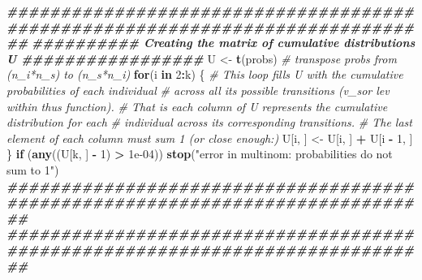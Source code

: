 \documentclass[
]{article}
\newenvironment{Shaded}{\begin{snugshade}}{\end{snugshade}}
\newcommand{\CommentTok}[1]{\textcolor[rgb]{0.56,0.35,0.01}{\textit{#1}}}
\newcommand{\ControlFlowTok}[1]{\textcolor[rgb]{0.13,0.29,0.53}{\textbf{#1}}}
\newcommand{\DecValTok}[1]{\textcolor[rgb]{0.00,0.00,0.81}{#1}}
\newcommand{\DocumentationTok}[1]{\textcolor[rgb]{0.56,0.35,0.01}{\textbf{\textit{#1}}}}
\newcommand{\FloatTok}[1]{\textcolor[rgb]{0.00,0.00,0.81}{#1}}
\newcommand{\FunctionTok}[1]{\textcolor[rgb]{0.13,0.29,0.53}{\textbf{#1}}}
\newcommand{\NormalTok}[1]{#1}
\newcommand{\OtherTok}[1]{\textcolor[rgb]{0.56,0.35,0.01}{#1}}
\newcommand{\SpecialCharTok}[1]{\textcolor[rgb]{0.81,0.36,0.00}{\textbf{#1}}}
\newcommand{\StringTok}[1]{\textcolor[rgb]{0.31,0.60,0.02}{#1}}
\begin{document}
\begin{Shaded}
\begin{Highlighting}[]
  
  \DocumentationTok{\#\#\#\#\#\#\#\#\#\#\#\#\#\#\#\#\#\#\#\#\#\#\#\#\#\#\#\#\#\#\#\#\#\#\#\#\#\#\#\#\#\#\#\#\#\#\#\#\#\#\#\#\#\#\#\#\#\#\#\#\#\#\#\#\#\#\#\#\#\#\#\#\#\#\#\#\#\#}
  \DocumentationTok{\#\#\#\#\#\#\#\#\#\# Creating the matrix of cumulative distributions U \#\#\#\#\#\#\#\#\#\#\#\#\#\#\#\#\#}
\NormalTok{  U }\OtherTok{\textless{}{-}} \FunctionTok{t}\NormalTok{(probs)    }\CommentTok{\# transpose probs from (\textasciigrave{}n\_i*n\_s\textasciigrave{}) to (\textasciigrave{}n\_s*n\_i\textasciigrave{})}
  \ControlFlowTok{for}\NormalTok{(i }\ControlFlowTok{in} \DecValTok{2}\SpecialCharTok{:}\NormalTok{k) \{  }
    \CommentTok{\# This loop fills U with the cumulative probabilities of each individual}
    \CommentTok{\# across all its possible transitions (\textasciigrave{}v\_s\textasciigrave{}or \textasciigrave{}lev\textasciigrave{} within thus function).}
    \CommentTok{\# That is each column of \textasciigrave{}U\textasciigrave{} represents the cumulative distribution for each}
    \CommentTok{\# individual across its corresponding transitions. }
    \CommentTok{\# The last element of each column must sum 1 (or close enough:)}
\NormalTok{    U[i, ] }\OtherTok{\textless{}{-}}\NormalTok{ U[i, ] }\SpecialCharTok{+}\NormalTok{ U[i }\SpecialCharTok{{-}} \DecValTok{1}\NormalTok{, ]}
\NormalTok{  \}}
  \ControlFlowTok{if}\NormalTok{ (}\FunctionTok{any}\NormalTok{((U[k, ] }\SpecialCharTok{{-}} \DecValTok{1}\NormalTok{) }\SpecialCharTok{\textgreater{}} \FloatTok{1e{-}04}\NormalTok{))}
    \FunctionTok{stop}\NormalTok{(}\StringTok{"error in multinom: probabilities do not sum to 1"}\NormalTok{)}
  \DocumentationTok{\#\#\#\#\#\#\#\#\#\#\#\#\#\#\#\#\#\#\#\#\#\#\#\#\#\#\#\#\#\#\#\#\#\#\#\#\#\#\#\#\#\#\#\#\#\#\#\#\#\#\#\#\#\#\#\#\#\#\#\#\#\#\#\#\#\#\#\#\#\#\#\#\#\#\#\#\#\#}
  \DocumentationTok{\#\#\#\#\#\#\#\#\#\#\#\#\#\#\#\#\#\#\#\#\#\#\#\#\#\#\#\#\#\#\#\#\#\#\#\#\#\#\#\#\#\#\#\#\#\#\#\#\#\#\#\#\#\#\#\#\#\#\#\#\#\#\#\#\#\#\#\#\#\#\#\#\#\#\#\#\#\#}
  

\end{Highlighting}
\end{Shaded}
\end{document}
